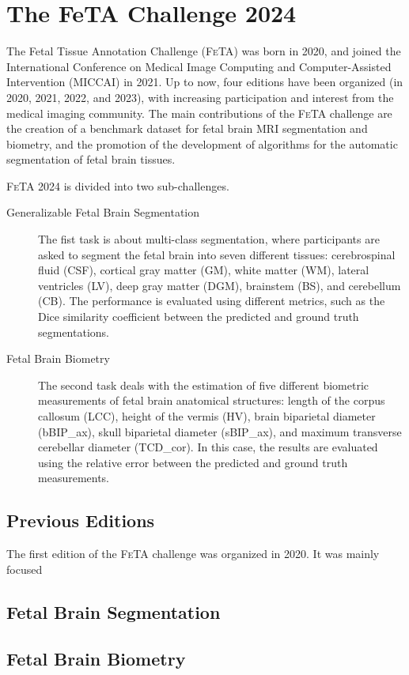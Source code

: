 \chapter{The FeTA Challenge 2024}
\vspace{1cm}

The Fetal Tissue Annotation Challenge (\textsc{FeTA}) \cite{FeTA2024} was born in 2020, and joined the International Conference on Medical Image Computing and Computer-Assisted Intervention (MICCAI) \cite{MICCAI} in 2021. Up to now, four editions have been organized (in 2020, 2021, 2022, and 2023), with increasing participation and interest from the medical imaging community. The main contributions of the \textsc{FeTA} challenge are the creation of a benchmark dataset for fetal brain MRI segmentation and biometry, and the promotion of the development of algorithms for the automatic segmentation of fetal brain tissues.

\textsc{FeTA} 2024 is divided into two sub-challenges.
\begin{description}
\item[Generalizable Fetal Brain Segmentation] The fist task is about multi-class segmentation, where participants are asked to segment the fetal brain into seven different tissues: cerebrospinal fluid (CSF), cortical gray matter (GM), white matter (WM), lateral ventricles (LV), deep gray matter (DGM), brainstem (BS), and cerebellum (CB). The performance is evaluated using different metrics, such as the Dice similarity coefficient between the predicted and ground truth segmentations.
\item[Fetal Brain Biometry] The second task deals with the estimation of five different biometric measurements of fetal brain anatomical structures: length of the corpus callosum (LCC), height of the vermis (HV), brain biparietal diameter (bBIP\_ax), skull biparietal diameter (sBIP\_ax), and maximum transverse cerebellar diameter (TCD\_cor). In this case, the results are evaluated using the relative error between the predicted and ground truth measurements. \cite{FeTA2024_paper}
\end{description}

\section{Previous Editions}
The first edition of the \textsc{FeTA} challenge was organized in 2020. It was mainly focused 

\section{Fetal Brain Segmentation}

\section{Fetal Brain Biometry}
